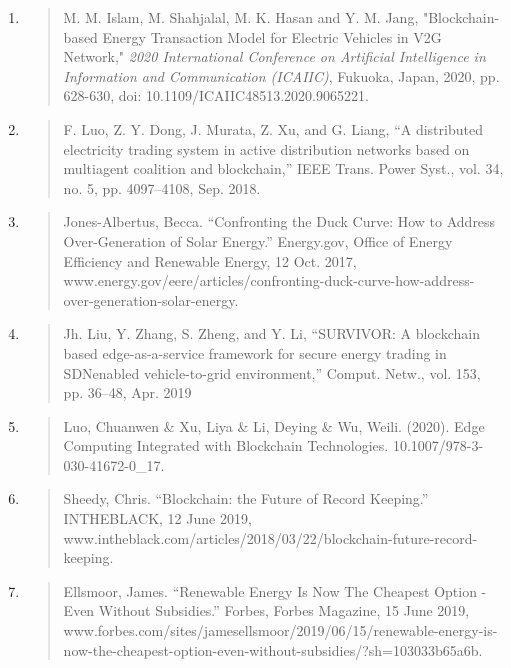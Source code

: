 \documentclass[
]{article}
\begin{document}
\begin{enumerate}
\def\labelenumi{\arabic{enumi}.}
\item
  \begin{quote}
  M. M. Islam, M. Shahjalal, M. K. Hasan and Y. M. Jang,
  "Blockchain-based Energy Transaction Model for Electric Vehicles in
  V2G Network," \emph{2020 International Conference on Artificial
  Intelligence in Information and Communication (ICAIIC)}, Fukuoka,
  Japan, 2020, pp. 628-630, doi: 10.1109/ICAIIC48513.2020.9065221.
  \end{quote}
\item
  \begin{quote}
  F. Luo, Z. Y. Dong, J. Murata, Z. Xu, and G. Liang, ``A distributed
  electricity trading system in active distribution networks based on
  multiagent coalition and blockchain,'' IEEE Trans. Power Syst., vol.
  34, no. 5, pp. 4097--4108, Sep. 2018.
  \end{quote}
\item
  \begin{quote}
  Jones-Albertus, Becca. ``Confronting the Duck Curve: How to Address
  Over-Generation of Solar Energy.'' Energy.gov, Office of Energy
  Efficiency and Renewable Energy, 12 Oct. 2017,
  www.energy.gov/eere/articles/confronting-duck-curve-how-address-over-generation-solar-energy.
  \end{quote}
\item
  \begin{quote}
  Jh. Liu, Y. Zhang, S. Zheng, and Y. Li, ``SURVIVOR: A blockchain based
  edge-as-a-service framework for secure energy trading in SDNenabled
  vehicle-to-grid environment,'' Comput. Netw., vol. 153, pp. 36--48,
  Apr. 2019
  \end{quote}
\item
  \begin{quote}
  Luo, Chuanwen \& Xu, Liya \& Li, Deying \& Wu, Weili. (2020). Edge
  Computing Integrated with Blockchain Technologies.
  10.1007/978-3-030-41672-0\_17.
  \end{quote}
\item
  \begin{quote}
  Sheedy, Chris. ``Blockchain: the Future of Record Keeping.''
  INTHEBLACK, 12 June 2019,
  www.intheblack.com/articles/2018/03/22/blockchain-future-record-keeping.
  \end{quote}
\item
  \begin{quote}
  Ellsmoor, James. ``Renewable Energy Is Now The Cheapest Option - Even
  Without Subsidies.'' Forbes, Forbes Magazine, 15 June 2019,
  www.forbes.com/sites/jamesellsmoor/2019/06/15/renewable-energy-is-now-the-cheapest-option-even-without-subsidies/?sh=103033b65a6b.
  \end{quote}
\end{enumerate}
\end{document}
